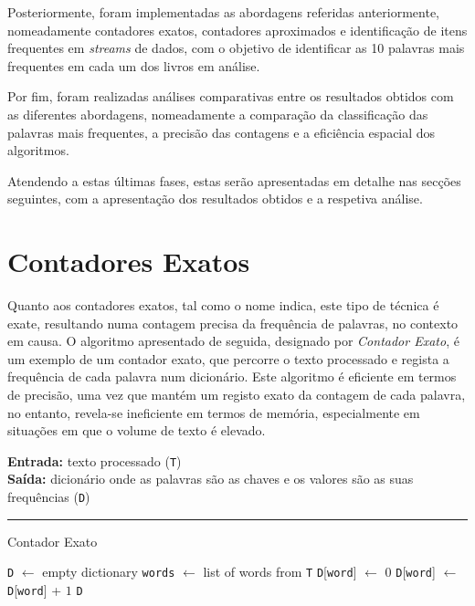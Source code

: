 \documentclass[mirror, portugues]{revdetua}
\begin{document}
Posteriormente, foram implementadas as abordagens referidas anteriormente, nomeadamente contadores exatos, contadores aproximados e identificação de itens frequentes em \textit{streams} de dados, com o objetivo de identificar as 10 palavras mais frequentes em cada um dos livros em análise.

Por fim, foram realizadas análises comparativas entre os resultados obtidos com as diferentes abordagens, nomeadamente a comparação da classificação das palavras mais frequentes, a precisão das contagens e a eficiência espacial dos algoritmos.

Atendendo a estas últimas fases, estas serão apresentadas em detalhe nas secções seguintes, com a apresentação dos resultados obtidos e a respetiva análise.

\section{Contadores Exatos}

Quanto aos contadores exatos, tal como o nome indica, este tipo de técnica é exate, resultando numa contagem precisa da frequência de palavras, no contexto em causa.
O algoritmo apresentado de seguida, designado por \textit{Contador Exato}, é um exemplo de um contador exato, que percorre o texto processado e regista a frequência de cada palavra num dicionário. Este algoritmo é eficiente em termos de precisão, uma vez que mantém um registo exato da contagem de cada palavra, no entanto, revela-se ineficiente em termos de memória, especialmente em situações em que o volume de texto é elevado.

\begin{algorithm}[H]
\raggedright
\textbf{Entrada:} texto processado (\texttt{T}) \\
\textbf{Saída:} dicionário onde as palavras são as chaves e os valores são as suas frequências (\texttt{D})\\
\hrule 
\caption{Contador Exato}
\begin{algorithmic}[1]
    \State \texttt{D} $\gets$ empty dictionary
    \State \texttt{words} $\gets$ list of words from \texttt{T}
            \State \texttt{D}[\texttt{word}] $\gets$ 0
        \EndIf
        \State \texttt{D}[\texttt{word}] $\gets$ \texttt{D}[\texttt{word}] + $1$
    \EndFor
    \State \Return \texttt{D}
\end{algorithmic}
\end{algorithm}
\end{document}
